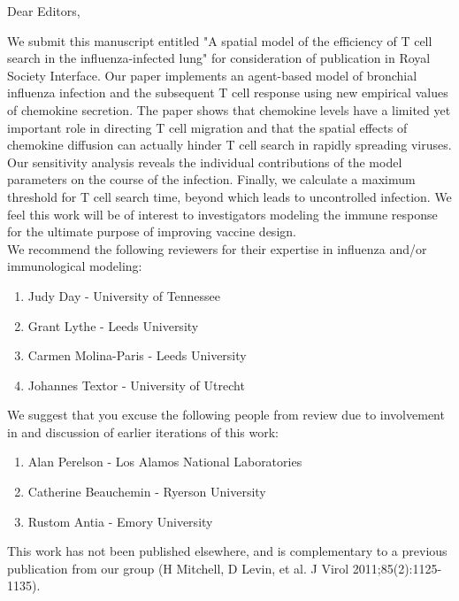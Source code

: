 \documentclass[10pt]{article}
\date{}
\begin{document}

\begin{flushleft}Dear Editors, \end{flushleft} 

We submit this manuscript entitled "A spatial model of the efficiency of T cell search in the influenza-infected lung" for consideration of publication in Royal Society Interface.  Our paper implements an agent-based model of bronchial influenza infection and the subsequent T cell response using new empirical values of chemokine secretion.  The paper shows that chemokine levels have a limited yet important role in directing T cell migration and that the spatial effects of chemokine diffusion can actually hinder T cell search in rapidly spreading viruses.  Our sensitivity analysis reveals the individual contributions of the model parameters on the course of the infection.  Finally, we calculate a maximum threshold for T cell search time, beyond which leads to uncontrolled infection.  We feel this work will be of interest to investigators modeling the immune response for the ultimate purpose of improving vaccine design.
 \\

We recommend the following reviewers for their expertise in influenza and/or immunological modeling:
\begin{enumerate}
\item Judy Day - University of Tennessee 
\item Grant Lythe - Leeds University
\item Carmen Molina-Paris - Leeds University
\item Johannes Textor - University of Utrecht
\end{enumerate}

We suggest that you excuse the following people from review due to involvement in and discussion of earlier iterations of this work:
\begin{enumerate}
\item Alan Perelson - Los Alamos National Laboratories 
\item Catherine Beauchemin - Ryerson University
\item Rustom Antia - Emory University
\end{enumerate}

This work has not been published elsewhere, and is complementary to a previous publication from our group (H Mitchell, D Levin, et al. J Virol 2011;85(2):1125-1135). \\
\end{document}
